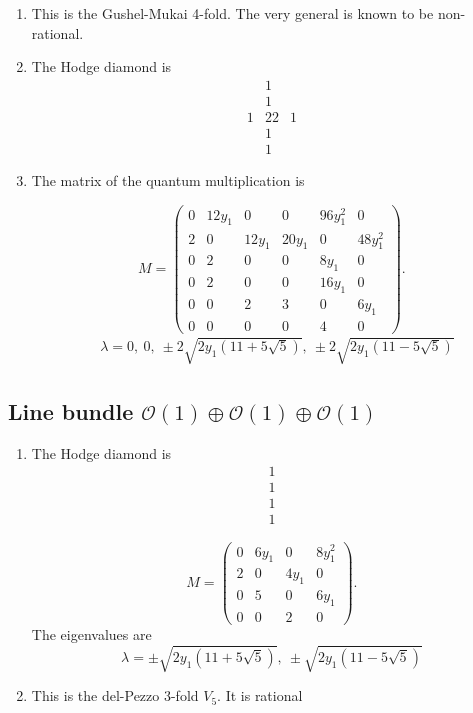 \documentclass[11pt]{amsart}
\newcounter{num}[section] %
\begin{document}
\begin{enumerate}
\item[1)] This is the Gushel-Mukai 4-fold. The very general is known to be non-rational.
    \item [2)]The Hodge diamond is
    \[
        \begin{array}{ccc}
             &1&  \\
             &1&\\
             1&22&1\\
             &1&\\
             &1&
        \end{array}
    \]

    \item[3)] The matrix of the quantum multiplication is

    \[
M=
\begin{pmatrix}
0&12y_1&0&0&96y_1^2&0\\
2&0&12y_1&20y_1&0&48y_1^2\\
0&2&0&0&8y_1&0\\
0&2&0&0&16y_1&0\\
0&0&2&3&0&6y_1\\
0&0&0&0&4&0
\end{pmatrix}.
\]
\begin{align}
&\lambda = 0, \ 0, \ \pm 2\sqrt{2y_1(11 + 5\sqrt{5})}, \ \pm 2\sqrt{2y_1(11 - 5\sqrt{5})}
\end{align}

\end{enumerate}

\subsection{Line bundle $\mathcal{O}(1) \oplus \mathcal{O}(1) \oplus \mathcal{O}(1)$}

\begin{enumerate}
    \item [1)]The Hodge diamond is
    \[
        \begin{array}{c}
             1  \\
             1\\
             1\\
             1
        \end{array}
    \]

\[
M=
\begin{pmatrix}
0&6y_1&0&8y_1^2\\
2&0&4y_1&0\\
0&5&0&6y_1\\
0&0&2&0
\end{pmatrix}.
\]
The eigenvalues are
\[
    \lambda = \pm \sqrt{2y_1(11 + 5\sqrt{5})}, \ \pm \sqrt{2y_1(11 - 5\sqrt{5})}
\]
\item[3)] This is the del-Pezzo 3-fold $V_5$. It is rational 
\end{enumerate}
\end{document}
